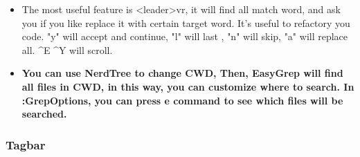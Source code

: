 \documentclass[a4paper,11pt,twoside]{book}
\begin{document}
\begin{itemize}
		\item The most useful feature is <leader>vr, it will find all match word, and ask you if you like replace it with certain target word. It's useful to refactory you code. "y" will accept and continue, "l" will last , "n" will skip, "a" will replace all. \^{}E \^{}Y will scroll.

		\item \textbf{You can use NerdTree to change CWD, Then, EasyGrep will find all files in CWD, in this way, you can customize where to search. In :GrepOptions, you can press e command to see which files will be searched.}
\end{itemize}

\subsubsection{Tagbar}
\end{document}
